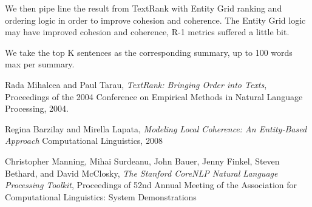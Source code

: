 \documentclass[11pt]{article}
\begin{document}
	We then pipe line the result from TextRank with Entity Grid ranking and ordering logic in order to improve cohesion and coherence. The Entity Grid logic may have improved cohesion and coherence, R-1 metrics suffered a little bit.
	
	We take the top K sentences as the corresponding summary, up to 100 words max per summary.
	
	
	\begin{thebibliography}{}
		
		Rada Mihalcea and Paul Tarau,
		\textit{TextRank: Bringing Order into Texts},
		Proceedings of the 2004 Conference on Empirical Methods in Natural Language Processing,
		2004.
		
		Regina Barzilay and Mirella Lapata,
		\textit{Modeling Local Coherence: An Entity-Based Approach}
		Computational Linguistics, 
		2008
		
		Christopher Manning, Mihai Surdeanu, John Bauer, Jenny Finkel, Steven Bethard, and David McClosky,
		\textit{The Stanford CoreNLP Natural Language Processing Toolkit},
		Proceedings of 52nd Annual Meeting of the Association for Computational Linguistics: System Demonstrations
	\end{thebibliography}
	
\end{document}
